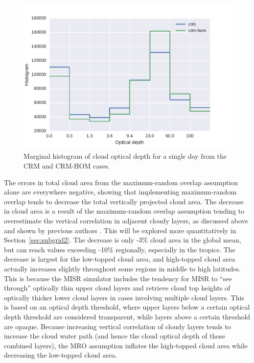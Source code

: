 \begin{figure}[htbp]
\centering
\includegraphics{graphics/subgrid1_taudist.pdf}
\caption{\label{fig:subgrid1_taudist}Marginal histogram of cloud optical
depth for a single day from the CRM and CRM-HOM
cases.}\label{fig:subgrid1ux5ftaudist}
\end{figure}

The errors in total cloud area from the maximum-random overlap
assumption alone are everywhere negative, showing that implementing
maximum-random overlap tends to decrease the total vertically projected
cloud area. The decrease in cloud area is a result of the maximum-random
overlap assumption tending to overestimate the vertical correlation in
adjacent cloudy layers, as discussed above and shown by previous authors
\citep{mace_and_benson-troth_2002, hogan_and_illingworth_2000, barker_2008}.
This will be explored more quantitatively in Section~\ref{sec:subgrid2}.
The decrease is only -3\% cloud area in the global mean, but can reach
values exceeding -10\% regionally, especially in the tropics. The
decrease is largest for the low-topped cloud area, and high-topped cloud
area actually increases slightly throughout some regions in middle to
high latitudes. This is because the MISR simulator includes the tendency
for MISR to ``see through'' optically thin upper cloud layers and
retrieve cloud top heights of optically thicker lower cloud layers in
cases involving multiple cloud layers. This is based on an optical depth
threshold, where upper layers below a certain optical depth threshold
are considered transparent, while layers above a certain threshold are
opaque. Because increasing vertical correlation of cloudy layers tends
to increase the cloud water path (and hence the cloud optical depth of
those combined layers), the MRO assumption inflates the high-topped
cloud area while decreasing the low-topped cloud area.

